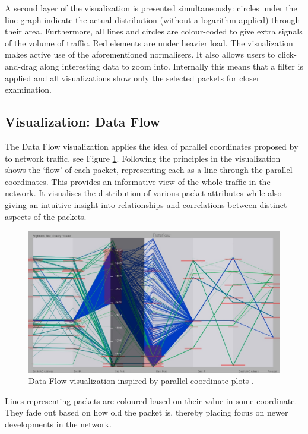 A second layer of the visualization is presented simultaneously: circles under the line graph
indicate the actual distribution (without a logarithm applied) through their area. Furthermore, all
lines and circles are colour-coded to give extra signals of the volume of traffic. Red elements are
under heavier load. The visualization makes active use of the aforementioned normalisers. It also allows users to click-and-drag along interesting data to zoom into. Internally this means that a filter is applied and all visualizations show only the selected packets for closer examination.

\subsection{Visualization: Data Flow}
%
The Data Flow visualization applies the idea of parallel coordinates proposed by
\cite{inselberg1985plane} to network traffic, see Figure \ref{fig:dataflow}. Following the
principles in \cite{fliggnetwork} the visualization shows the `flow' of each packet, representing
each as a line through the parallel coordinates. This provides an informative view of the whole
traffic in the network. It visualises the distribution of various packet attributes while also
giving an intuitive insight into relationships and correlations between distinct aspects of the
packets. 

\begin{figure}[htb]
   \centering
   \includegraphics[width=\linewidth]{materials/dataflow.jpg}
   \caption[Data Flow]{\label{fig:dataflow}
         Data Flow visualization inspired by parallel coordinate plots \cite{inselberg1985plane}.}
\end{figure}

Lines representing packets are coloured based on their value in some coordinate. They fade out based
on how old the packet is, thereby placing focus on newer developments in the network.

